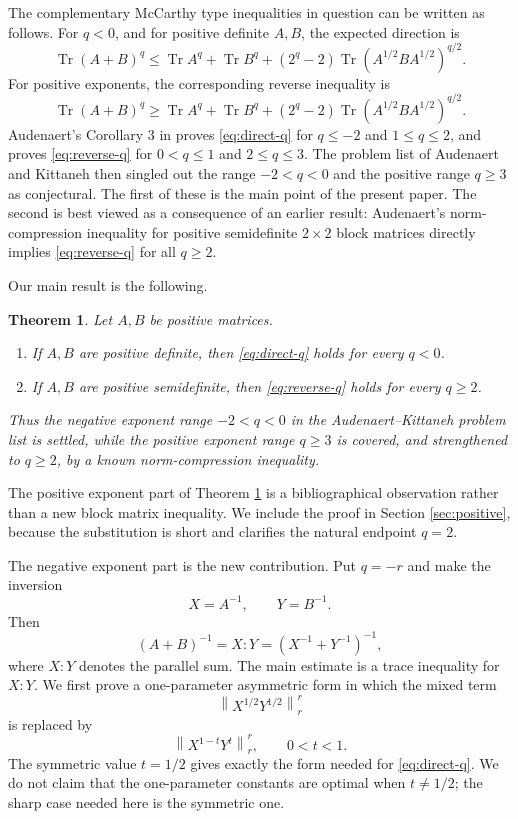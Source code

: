 \documentclass[11pt]{amsart}
\numberwithin{equation}{section}
\newtheorem{theorem}{Theorem}[section]
\newcommand{\Tr}{\operatorname{Tr}}
\newcommand{\norm}[1]{\left\lVert #1\right\rVert}
\begin{document}
The complementary McCarthy type inequalities in question can be written as follows.  For \(q<0\), and for positive definite \(A,B\), the expected direction is
\begin{equation}\label{eq:direct-q}
    \Tr(A+B)^q
    \le
    \Tr A^q+\Tr B^q
    +(2^q-2)\Tr(A^{1/2}BA^{1/2})^{q/2}.
\end{equation}
For positive exponents, the corresponding reverse inequality is
\begin{equation}\label{eq:reverse-q}
    \Tr(A+B)^q
    \ge
    \Tr A^q+\Tr B^q
    +(2^q-2)\Tr(A^{1/2}BA^{1/2})^{q/2}.
\end{equation}
Audenaert's Corollary 3 in \cite{Audenaert2012Trace} proves \eqref{eq:direct-q} for \(q\le -2\) and \(1\le q\le 2\), and proves \eqref{eq:reverse-q} for \(0<q\le 1\) and \(2\le q\le 3\).  The problem list of Audenaert and Kittaneh \cite[Section 3]{AudenaertKittaneh2012Problems} then singled out the range \(-2<q<0\) and the positive range \(q\ge 3\) as conjectural.  The first of these is the main point of the present paper.  The second is best viewed as a consequence of an earlier result: Audenaert's norm-compression inequality for positive semidefinite \(2\times2\) block matrices \cite{Audenaert2006NormCompression} directly implies \eqref{eq:reverse-q} for all \(q\ge 2\).

Our main result is the following.

\begin{theorem}\label{thm:main}
Let \(A,B\) be positive matrices.
\begin{enumerate}[label=\textup{(\roman*)}]
    \item If \(A,B\) are positive definite, then \eqref{eq:direct-q} holds for every \(q<0\).
    \item If \(A,B\) are positive semidefinite, then \eqref{eq:reverse-q} holds for every \(q\ge 2\).
\end{enumerate}
Thus the negative exponent range \(-2<q<0\) in the Audenaert--Kittaneh problem list is settled, while the positive exponent range \(q\ge 3\) is covered, and strengthened to \(q\ge 2\), by a known norm-compression inequality.
\end{theorem}

The positive exponent part of Theorem \ref{thm:main} is a bibliographical observation rather than a new block matrix inequality.  We include the proof in Section \ref{sec:positive}, because the substitution is short and clarifies the natural endpoint \(q=2\).

The negative exponent part is the new contribution.  Put \(q=-r\) and make the inversion
\[
    X=A^{-1},\qquad Y=B^{-1}.
\]
Then
\[
    (A+B)^{-1}=X:Y=(X^{-1}+Y^{-1})^{-1},
\]
where \(X:Y\) denotes the parallel sum.  The main estimate is a trace inequality for \(X:Y\).  We first prove a one-parameter asymmetric form in which the mixed term
\[
    \norm{X^{1/2}Y^{1/2}}_r^r
\]
is replaced by
\[
    \norm{X^{1-t}Y^t}_r^r,\qquad 0<t<1.
\]
The symmetric value \(t=1/2\) gives exactly the form needed for \eqref{eq:direct-q}.  We do not claim that the one-parameter constants are optimal when \(t\ne 1/2\); the sharp case needed here is the symmetric one.
\end{document}
